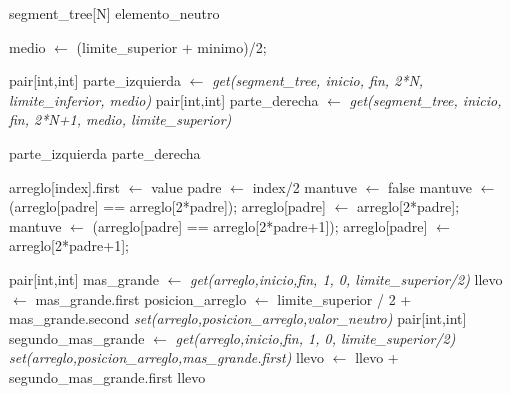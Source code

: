 \begin{algorithmic}
	 
		\State \Return segment_tree[N]
	\EndIf
	 
		\State \Return elemento_neutro
	\EndIf


	\State medio $\gets$ (limite_superior + minimo)/2;
	
	\State pair[int,int] parte_izquierda $\gets$ \textit{get(segment_tree, inicio, fin, 2*N, limite_inferior, medio)}
	\State pair[int,int] parte_derecha $\gets$ \textit{get(segment_tree, inicio, fin, 2*N+1, medio, limite_superior)}
	
		\State \Return parte_izquierda
	\Else
		\State \Return parte_derecha
	\EndIf


\EndFunction
\end{algorithmic}
\hspace{.5cm}



\begin{algorithmic}
	\State arreglo[index].first $\gets$ value
	\State padre $\gets$ index/2
	\State mantuve $\gets$ false
		 	\State mantuve $\gets$ (arreglo[padre] == arreglo[2*padre]);
			\State arreglo[padre] $\gets$ arreglo[2*padre]; 	
		\Else
			\State mantuve $\gets$ (arreglo[padre] == arreglo[2*padre+1]);
		 	\State arreglo[padre] $\gets$ arreglo[2*padre+1];
		\EndIf
	\EndWhile 
\EndFunction
\end{algorithmic}
\hspace{.5cm}

\begin{algorithmic}

	\State pair[int,int] mas_grande $\gets$ \textit{get(arreglo,inicio,fin, 1, 0, limite_superior/2)} 
	\State llevo $\gets$ mas_grande.first
	\State posicion_arreglo $\gets$ limite_superior / 2 + mas_grande.second
	\State \textit{set(arreglo,posicion_arreglo,valor_neutro)} 
	\State pair[int,int] segundo_mas_grande $\gets$ \textit{get(arreglo,inicio,fin, 1, 0, limite_superior/2)} 
	\State \textit{set(arreglo,posicion_arreglo,mas_grande.first)} 
	\State llevo $\gets$ llevo + segundo_mas_grande.first 
	\State \Return llevo

\EndFunction
\end{algorithmic}
\hspace{.5cm}

